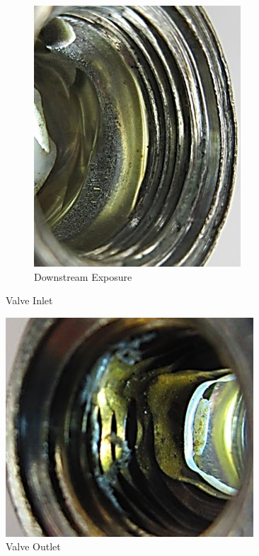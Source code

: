 \documentclass[]{article}
\begin{document}
\begin{figure}[h]
\begin{subfigure}[h]{0.4\textwidth}
		\includegraphics[width=\textwidth]{Photos/Body_side2}
		\caption{Downstream Exposure}
		\label{fig:bodyside2}
	\end{subfigure}

	\caption{Valve Inlet}\label{fig:inlet}
\end{figure}



\begin{figure}[h]
	\centering
	\includegraphics[width=0.6\linewidth]{Photos/Body_outlet}
	\caption{Valve Outlet}
	\label{fig:bodyoutlet}
\end{figure}
\FloatBarrier
\end{document}
